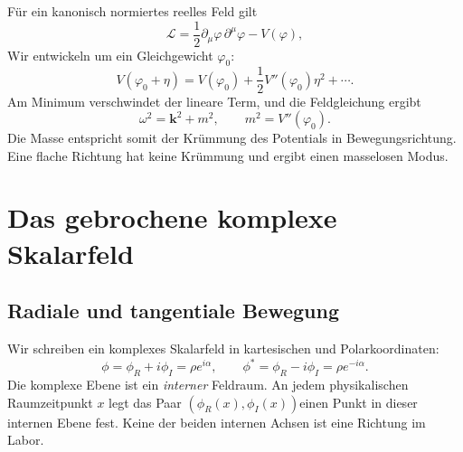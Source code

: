 \begin{classroomqa}
\end{classroomqa}

Für ein kanonisch normiertes reelles Feld gilt
\begin{equation}
  \mathcal L
  =\frac12\partial_\mu\varphi\,\partial^\mu\varphi-V(\varphi),
\end{equation}
Wir entwickeln um ein Gleichgewicht \(\varphi_0\):
\begin{equation}
  V(\varphi_0+\eta)
  =V(\varphi_0)
   +\frac12V''(\varphi_0)\eta^2+\cdots.
\end{equation}
Am Minimum verschwindet der lineare Term, und die Feldgleichung ergibt
\begin{equation}
  \omega^2=\bm{k}^2+m^2,
  \qquad
  m^2=V''(\varphi_0).
  \label{eq:l08-curvature-mass}
\end{equation}
Die Masse entspricht somit der Krümmung des Potentials in Bewegungsrichtung. Eine flache Richtung hat keine Krümmung und ergibt einen masselosen Modus.

\section{Das gebrochene komplexe Skalarfeld}

\subsection{Radiale und tangentiale Bewegung}

Wir schreiben ein komplexes Skalarfeld in kartesischen und Polarkoordinaten:
\begin{equation}
  \phi=\phi_R+i\phi_I=\rho e^{i\alpha},
  \qquad
  \phi^*=\phi_R-i\phi_I=\rho e^{-i\alpha}.
  \label{eq:l08-polar-field}
\end{equation}
Die komplexe Ebene ist ein \emph{interner} Feldraum. An jedem physikalischen Raumzeitpunkt \(x\) legt das Paar
\((\phi_R(x),\phi_I(x))\)einen Punkt in dieser internen Ebene fest.
Keine der beiden internen Achsen ist eine Richtung im Labor.

